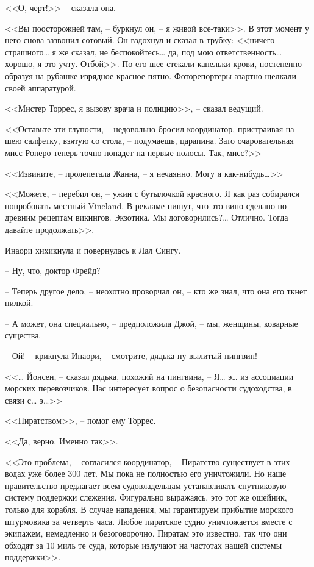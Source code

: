 <<О, черт!>> -- сказала она.

<<Вы поосторожней там, -- буркнул он, -- я живой все-таки>>. В этот момент у него снова зазвонил сотовый. Он вздохнул и сказал в трубку: <<ничего страшного\ldots{} я же сказал, не беспокойтесь\ldots{} да, под мою ответственность\ldots{} хорошо, я это учту. Отбой>>. По его шее стекали капельки крови, постепенно образуя на рубашке изрядное красное пятно. Фоторепортеры азартно щелкали своей аппаратурой.

<<Мистер Торрес, я вызову врача и полицию>>, -- сказал ведущий.

<<Оставьте эти глупости, -- недовольно бросил координатор, пристраивая на шею салфетку, взятую со стола, -- подумаешь, царапина. Зато очаровательная мисс Ронеро теперь точно попадет на первые полосы. Так, мисс?>>

<<Извините, -- пролепетала Жанна, -- я нечаянно. Могу я как-нибудь\ldots{}>>

<<Можете, -- перебил он, -- ужин с бутылочкой красного. Я как раз собирался попробовать местный Vineland. В рекламе пишут, что это вино сделано по древним рецептам викингов. Экзотика. Мы договорились?\ldots{} Отлично. Тогда давайте продолжать>>.

Инаори хихикнула и повернулась к Лал Сингу.

-- Ну, что, доктор Фрейд?

-- Теперь другое дело, -- неохотно проворчал он, -- кто же знал, что она его ткнет пилкой.

-- А может, она специально, -- предположила Джой, -- мы, женщины, коварные существа.

-- Ой! -- крикнула Инаори, -- смотрите, дядька ну вылитый пингвин!

<<\ldots{} Йонсен, -- сказал дядька, похожий на пингвина, -- Я\ldots{} э\ldots{} из ассоциации морских перевозчиков. Нас интересует вопрос о безопасности судоходства, в связи с\ldots{} э\ldots{}>>

<<Пиратством>>, -- помог ему Торрес.

<<Да, верно. Именно так>>.

<<Это проблема, -- согласился координатор, -- Пиратство существует в этих водах уже более 300 лет. Мы пока не полностью его уничтожили. Но наше правительство предлагает всем судовладельцам устанавливать спутниковую систему поддержки слежения. Фигурально выражаясь, это тот же ошейник, только для корабля. В случае нападения, мы гарантируем прибытие морского штурмовика за четверть часа. Любое пиратское судно уничтожается вместе с экипажем, немедленно и безоговорочно. Пиратам это известно, так что они обходят за 10 миль те суда, которые излучают на частотах нашей системы поддержки>>.

